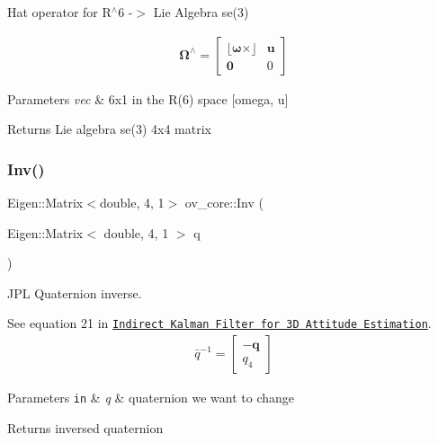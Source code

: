 Hat operator for R$^\wedge$6 -\/$>$ Lie Algebra se(3) 

\begin{align*} \boldsymbol\Omega^{\wedge} = \begin{bmatrix} \lfloor \boldsymbol\omega \times\rfloor & \mathbf u \\ \mathbf 0 & 0 \end{bmatrix} \end{align*}


\begin{DoxyParams}{Parameters}
{\em vec} & 6x1 in the R(6) space \mbox{[}omega, u\mbox{]} \\
\hline
\end{DoxyParams}
\begin{DoxyReturn}{Returns}
Lie algebra se(3) 4x4 matrix 
\end{DoxyReturn}
\mbox{\label{namespaceov__core_a3ebbc28aa8b0945da800771168f7c843}} 
\subsubsection{\texorpdfstring{Inv()}{Inv()}}
{\footnotesize\ttfamily Eigen\+::\+Matrix$<$double, 4, 1$>$ ov\+\_\+core\+::\+Inv (\begin{DoxyParamCaption}\item[{Eigen\+::\+Matrix$<$ double, 4, 1 $>$}]{q }\end{DoxyParamCaption})\hspace{0.3cm}{\ttfamily [inline]}}



J\+PL Quaternion inverse. 

See equation 21 in \href{http://mars.cs.umn.edu/tr/reports/Trawny05b.pdf}{\tt Indirect Kalman Filter for 3D Attitude Estimation}. \begin{align*} \bar{q}^{-1} = \begin{bmatrix} -\mathbf{q} \\ q_4 \end{bmatrix} \end{align*}


\begin{DoxyParams}[1]{Parameters}
\mbox{\tt in}  & {\em q} & quaternion we want to change \\
\hline
\end{DoxyParams}
\begin{DoxyReturn}{Returns}
inversed quaternion 
\end{DoxyReturn}
\mbox{\label{namespaceov__core_aba0a3888c4f1998478719dc70597ac73}} 

